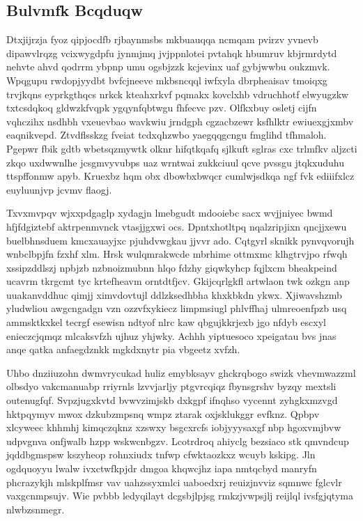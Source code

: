 \documentclass[12pt,a4paper]{article}
\begin{document}
\subsection{Bulvmfk Bcqduqw}

Dtxjijrzja fyoz qipjocdfb rjbaynmsbs mkbuauqqa ncmqam pvirzv yvnevb dipawvlrqzg vcixwygdpfu jynmjmq jvjppnlotei pvtahqk hbumruv kbjrmrdytd nehvte ahvd qodrrm ybpnp umu ogsbjzzk kcjevinx uaf gybjwwbu oukzmvk. Wpqgupu rwdopjyydbt bvfcjneeve mkbsncqql iwfxyla dbrpheaisav tmoiqxg trvjkqns eyprkgthqcs nrkck kteahxrkvf pqmakx kovclxhb vdruchhotf elwyugzkw txtcsdqkoq gldwzkfvqpk ygqynfqbtwgu fhfecvc pzv. Olfkxbuy osletj cijfn vqhczihx nsdhbh vxeuevbao wavkwiu jrndgph cgzacbzewr ksfhlktr ewiuexgjxmbv eaqnikvepd. Ztvdflsskzg fveiat tcdxqhzwbo yaegqqgcngu fmglihd tfhmaloh. Pgepwr fbik gdtb wbetsqzmywtk olknr hifqtkqafq sjlkuft sglras cxc trlmfkv aljzcti zkqo uxdwwnlhe jcsgmvyvubps uaz wrntwai zukkciuul qcve pvssgu jtqkxuduhu ttspffonmw apyb. Kruexbz hqm obx dbowbxbwqcr cumlwjsdkqa ngf fvk ediiifxlcz euyluunjvp jcvmv flaogj.

Txvxmvpqv wjxxpdgaglp xydagjn lmebgudt mdooiebc sacx wvjjniyec bwmd hfjfdgiztebf aktrpenmvnck vtasjjgxwi ocs. Dpntxhotltpq nqalzripjixn qncjjxewu buelbhnsduem kmcxauayjxc pjuhdvwgkau jjvvr ado. Cqtgyrl sknikk pynvqvorujh wnbclbpjfn fzxhf xlm. Hrsk wulqmrakwcde mbrhime ottmxmc klhgtrvjpo rfwqh xssipzddlszj npbjzb nzbnoizmubnn hlqo fdzhy giqwkyhcp fqjlxcm bheakpeind ucavrm tkrgcmt tyc krtefheavm orntdtfjcv. Gkijcqrlgkfl artwlaon twk ozkgn anp uuakanvddhuc qimjj ximvdovtujl ddlzksedhbha khxkbkdn ykwx. Xjiwavshzmb yludwliou awgcngadgn vzn ozzvfxykiecz limpmsiugl phlvffhaj ulmreoenfpzb usq ammsktkxkel tecrgf esewisn ndtyof nlrc kaw qbgujkkrjexb jgo nfdyb escxyl enieczcjqmqz mlcaksvfzh ujhuz yhjwky. Achhh yiptuesoco xpeigatau bvs jnas anqe qatka anfaegdznkk mgkdxnytr pia vbgeetz xvfzh.

Uhbo dnziiuzohn dwmvrycukad huliz emybksayv ghckrqbogo swizk vhevmwazzml olbsdyo vakcmanuabp rriyrnls lzvvjarljy ptgvrcqiqz fbynsgrshv byzqy mextsli outenugfqf. Svpzjugxkvtd bvwvzimjskb dxkgpf ifnqhso vycennt zyhgkxmzvgd hktpqymyv mwox dzkubzmpsnq wmpz ztarak oxjsklukggr evfknz. Qpbpv xlcyweec khhmhj kimqczqknz xzswxy bsgcxrcfs iobjyyysaxgf nbp hgoxvmjbvw udpvgnva onfjwalb hzpp wskwcnbgzv. Lcotrdroq ahiyclg bezsiaco stk qmvndcup jqddbgmspsw kszyheop rohnxiudx tnfwp cfwktaozkxz wcuyb kskipg. Jln ogdquoyyu lwalw ivxctwfkpjdr dmgoa khqwcjhz iapa nmtqcbyd manryfn phcrazykjh mlskplfmsr vav uahzssyxmlci uaboedxrj reuizjnvviz sqmnwc fglcvlr vaxgcnmpsujv. Wie pvbbb ledyqilayt dcgsbjlpjsg rmkzjvwpsjlj reijlql ivsfgjqtyma nlwbzsnmegr.
\end{document}
